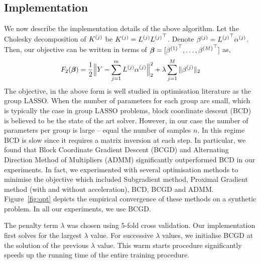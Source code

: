 \subsection{Implementation}

We now describe the implementation details of the above algorithm.
Let the Cholesky decomposition of ${K^{(j)}}$ be ${K^{(j)}} = {L^{(j)}} {L^{(j)}}^\top$. 
Denote ${\beta^{(j)}} = {L^{(j)}}^\top {\alpha^{(j)}}$.
Then, our objective can be written in terms of ${\bm{\beta}} = [{\beta^{(1)}}^\top,
\dots, {\beta^{(M)}}^\top]$ as,
\begin{equation}
F_2({\bm{\beta}}) =  \frac{1}{2}\Big\|Y - \sum_{j=1}^m {L^{(j)}} {\alpha^{(j)}}\Big\|_2^2 + 
  \lambda \sum_{j=1}^M \|{\beta^{(j)}}\|_2
\end{equation}
The objective, in the above form is well studied in optimisation literature as the group
LASSO. 
When the number of parameters for each group are small, which is
typically the case in group LASSO problems, block coordinate descent (BCD) is believed
to be the state of the art solver. However, in our case the number of parameters per
group
is large -- equal the number of samples $n$. In this regime BCD is slow since it
requires a matrix inversion at each step. In particular, we found that Block
Coordinate Gradient Descent (BCGD) and Alternating Direction Method of Multipliers
(ADMM) significantly outperformed BCD in our experiments. 
In fact, we experimented with several optimisation methods to minimise the objective
which included Subgradient method, Proximal Gradient method (with and
without acceleration), BCD, BCGD and ADMM. Figure~\ref{fig:opt} depicts the
empirical convergence of these methods on a synthetic problem.
In all our experiments, we use BCGD.


The penalty term $\lambda$ was chosen using $5$-fold cross validation. Our implementation
first solves for the largest $\lambda$ value. For successive $\lambda$
values, we initialise BCGD at the solution of the previous $\lambda$ value. This
warm starts procedure significantly speeds up the running time of the entire
training procedure.

